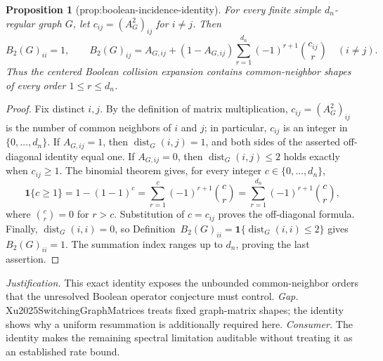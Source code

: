 \documentclass{article}
\newtheorem{proposition}{Proposition}
\begin{document}
\begin{proposition}[prop:boolean-incidence-identity]\label{prop:boolean-incidence-identity}
For every finite simple \(d_n\)-regular graph \(G\), let \(c_{ij}=(A_G^2)_{ij}\) for \(i\ne j\).  Then
\[
B_2(G)_{ii}=1,
\qquad
B_2(G)_{ij}=A_{G,ij}+(1-A_{G,ij})
\sum_{r=1}^{d_n}(-1)^{r+1}\binom{c_{ij}}{r}
\quad(i\ne j).
\]
Thus the centered Boolean collision expansion contains common-neighbor shapes of every order \(1\le r\le d_n\).
\end{proposition}
\begin{proof}
Fix distinct \(i,j\).  By the definition of matrix multiplication, \(c_{ij}=(A_G^2)_{ij}\) is the number of common neighbors of \(i\) and \(j\); in particular, \(c_{ij}\) is an integer in \(\{0,\ldots,d_n\}\).  If \(A_{G,ij}=1\), then \(\operatorname{dist}_G(i,j)=1\), and both sides of the asserted off-diagonal identity equal one.  If \(A_{G,ij}=0\), then \(\operatorname{dist}_G(i,j)\le2\) holds exactly when \(c_{ij}\ge1\).  The binomial theorem gives, for every integer \(c\in\{0,\ldots,d_n\}\),
\[
\mathbf 1\{c\ge1\}=1-(1-1)^c
=\sum_{r=1}^{c}(-1)^{r+1}\binom cr
=\sum_{r=1}^{d_n}(-1)^{r+1}\binom cr,
\]
where \(\binom cr=0\) for \(r>c\).  Substitution of \(c=c_{ij}\) proves the off-diagonal formula.  Finally, \(\operatorname{dist}_G(i,i)=0\), so Definition~\(B_2(G)_{ii}=\mathbf 1\{\operatorname{dist}_G(i,i)\le2\}\) gives \(B_2(G)_{ii}=1\).  The summation index ranges up to \(d_n\), proving the last assertion.
\end{proof}
\par\smallskip\noindent \textit{Justification.} This exact identity exposes the unbounded common-neighbor orders that the unresolved Boolean operator conjecture must control. \textit{Gap.} Xu2025SwitchingGraphMatrices treats fixed graph-matrix shapes; the identity shows why a uniform resummation is additionally required here. \textit{Consumer.} The identity makes the remaining spectral limitation auditable without treating it as an established rate bound.
\end{document}
